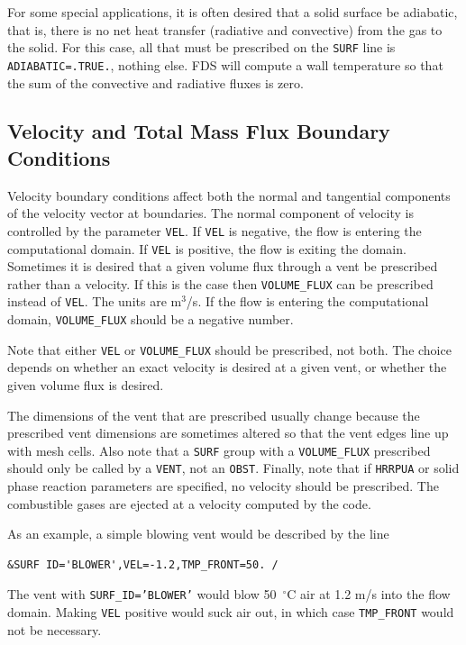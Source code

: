 \documentclass[11pt]{book}
\newcommand{\ct}{\tt\small}
\begin{document}
For some special applications, it is often desired that a solid
surface be adiabatic, that is, there is no net heat transfer
(radiative and convective) from the gas to the solid. For this case,
all that must be prescribed on the {\ct SURF} line is {\ct
ADIABATIC=.TRUE.}, nothing else.  FDS will compute a wall temperature
so that the sum of the convective and radiative fluxes is zero.

\subsection{Velocity and Total Mass Flux Boundary Conditions}
 
Velocity boundary conditions affect both the normal and tangential
components of the velocity vector at boundaries.
The normal component of velocity is controlled by the parameter
{\ct VEL}. If {\ct VEL} is negative, the flow is entering the
computational domain. If {\ct VEL} is positive, the flow is exiting the
domain.
Sometimes it is desired that a given volume flux through a vent
be prescribed rather than a velocity. If this is the case then
{\ct VOLUME\_FLUX} can be prescribed instead of {\ct VEL}. The units
are m$^3$/s.
If the flow is entering the computational domain, {\ct VOLUME\_FLUX}
should be a negative number.
\begin{warning}
\noindent
Note that either {\ct VEL} or {\ct VOLUME\_FLUX} should be prescribed,
not both.  The choice depends on whether an exact velocity is desired at a
given vent, or whether the given volume flux is desired.
\end{warning}
The dimensions of the vent that are prescribed usually change
because the prescribed vent dimensions are sometimes altered so that
the vent edges line up with mesh cells. Also note that a {\ct SURF}
group with a {\ct VOLUME\_FLUX} prescribed should only be called by a
{\ct VENT}, not an {\ct OBST}.
Finally, note that if {\ct HRRPUA} or solid phase reaction parameters are
specified, no velocity should be prescribed. The combustible gases
are ejected at a velocity computed by the code.

As an example, a simple blowing vent would be described by the line

\footnotesize
\begin{verbatim}
&SURF ID='BLOWER',VEL=-1.2,TMP_FRONT=50. /
\end{verbatim}
\normalsize

\noindent
The vent with {\ct SURF\_ID='BLOWER'} would blow 50~$^\circ$C
air at 1.2 m/s into the flow domain. Making {\ct VEL} positive would
suck air out, in which case {\ct TMP\_FRONT} would not be necessary.
\end{document}
